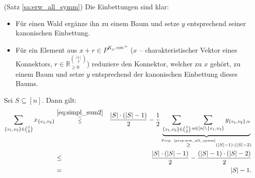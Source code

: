 \documentclass[10p,a4paper,BCOR = 12mm, DIV=15]{scrbook}
\begin{document}
\begin{bew} (Satz \ref{sa:erw_all_symm}) Die Einbettungen sind klar:
\begin{itemize}
\item Für einen Wald ergänze ihn zu einem Baum und setze $y$ entsprechend seiner kanonischen Einbettung.
\item Für ein Element aus $x + r \in {P^{K_n, con}}^+$ ($x$ -- charakteristischer Vektor eines Konnektors, $r \in \mathbb{R}^{\left[n\right] \choose 2}_{\geq 0}$) reduziere den Konnektor, welcher zu $x$ gehört, zu einem Baum und setze $y$ entsprechend der kanonischen Einbettung dieses Baums.
\end{itemize}

Sei $S \subseteq \left[n\right]$. Dann gilt:
\begin{eqnarray*}
\sum_{\left\{v_1, v_2\right\} \in {S \choose 2}} x_{\left\{v_1, v_2\right\}} & \stackrel{\eqref{eq:simpl_sum2}}{\substack{= \\ \leq}} & \frac{\left|S\right| \cdot \left(\left|S\right| - 1\right)}{2} - \frac{1}{2} \underbrace{\sum_{\left\{v_1, v_2\right\} \in {S \choose 2}} \sum_{u \in \left[n\right] \backslash \left\{v_1, v_2\right\}} y_{\left\{v_1, v_2\right\}, u}}_{\stackrel{\textnormal{Prop. \ref{prop:erw_all_symm}}}{\geq} \left(\left|S\right| - 1\right) \cdot \left(\left|S\right| - 2\right)} \\
& \leq & \frac{\left|S\right| \cdot \left(\left|S\right| - 1\right)}{2} - \frac{\left(\left|S\right| - 1\right) \cdot \left(\left|S\right| - 2\right)}{2} \\
& = & \left|S\right| - 1.
\end{eqnarray*}


\end{bew}
\end{document}
